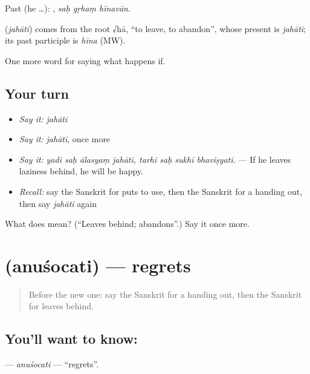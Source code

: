 Past (he …):   , \emph{saḥ gṛhaṃ hīnavān}.

\begin{cousinweb}
\textbf{} (\emph{jahāti}) comes from the root √hā, \textquotedblleft{}to leave, to abandon\textquotedblright{}, whose present is \emph{jahāti}; its past participle is \emph{hīna} (MW).
\end{cousinweb}

\begin{grammarlens}[title={What you've built}]
One more word for saying what happens if.
\end{grammarlens}

\subsection*{Your turn}
\begin{itemize}
\raggedright
  \item \emph{Say it:} \emph{jahāti}
  \item \emph{Say it:} \emph{jahāti}, once more
  \item \emph{Say it:} \emph{yadi saḥ ālasyaṃ jahāti, tarhi saḥ sukhī bhaviṣyati.} — If he leaves laziness behind, he will be happy.
  \item \emph{Recall:} say the Sanskrit for puts to use, then the Sanskrit for a handing out, then say \emph{jahāti} again
\end{itemize}

\begin{tcolorbox}[breakable,colback=teal!4,colframe=teal!35!black,title={Before you move on}]
What does  mean? (\textquotedblleft{}Leaves behind; abandons\textquotedblright{}.) Say it once more.
\end{tcolorbox}
\section[\texorpdfstring{\sk{अनुशोचति} (anuśocati)}{अनुशोचति (anuśocati)}]{ (anuśocati) — regrets}

\label{lesson:SA-C551-anusocati}



\begin{quote}
Before the new one: say the Sanskrit for a handing out, then the Sanskrit for leaves behind.
\end{quote}

\subsection*{You'll want to know: }
\textbf{} — \emph{anuśocati} — \textquotedblleft{}regrets\textquotedblright{}.

